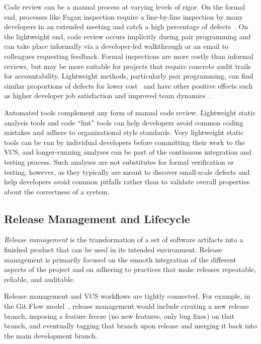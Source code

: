 Code review can be a manual process at varying levels of rigor. On the
formal end, processes like Fagan inspection require a line-by-line
inspection by many developers in an extended meeting and catch a high
percentage of defects~\cite{fagan2002design}. On the lightweight end,
code review occurs implicitly during pair programming and can take
place informally via a developer-led walkthrough or an email to
colleagues requesting feedback. Formal inspections are more costly
than informal reviews, but may be more suitable for projects that
require concrete audit trails for accountability. Lightweight methods,
particularly pair programming, can find similar proportions of defects
for lower cost~\cite{tomayko2002comparison} and have other positive
effects such as higher developer job satisfaction and improved team
dynamics~\cite{cockburn2000costs}.

Automated tools complement any form of manual code review. Lightweight
static analysis tools and code ``lint'' tools can help developers
avoid common coding mistakes and adhere to organizational style
standards. Very lightweight static tools can be run by individual
developers before committing their work to the VCS, and longer-running
analyses can be part of the continuous integration and testing
process. Such analyses are not substitutes for formal verification or
testing, however, as they typically are meant to discover small-scale
defects and help developers avoid common pitfalls rather than to
validate overall properties about the correctness of a system.

\subsection{Release Management and Lifecycle}

\emph{Release management} is the transformation of a set of software
artifacts into a finished product that can be used in its intended
environment. Release management is primarily focused on the smooth
integration of the different aspects of the project and on adhering to
practices that make releases repeatable, reliable, and auditable.

Release management and VCS workflows are tightly connected. For
example, in the Git Flow model~\cite{atlassianworkflow}, release
management would include creating a new release branch, imposing a
feature freeze (no new features, only bug fixes) on that branch, and
eventually tagging that branch upon release and merging it back into
the main development branch.

